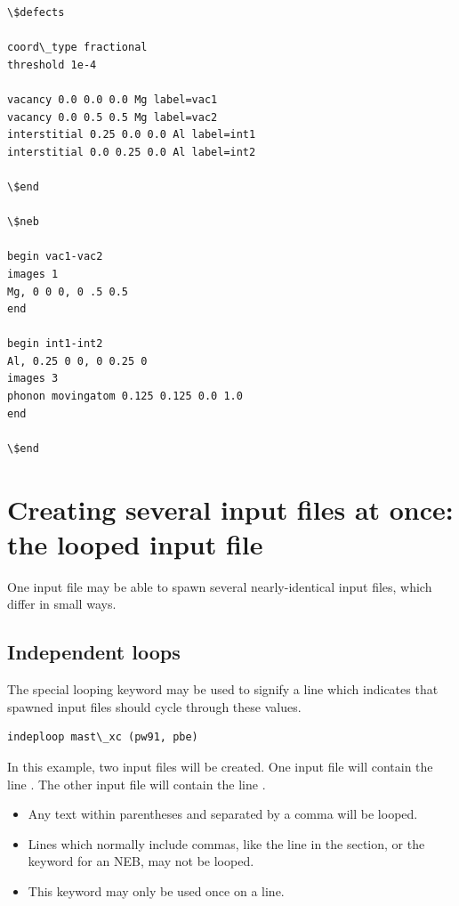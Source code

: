 \documentclass[letterpaper,10pt,english]{sphinxmanual}
\begin{document}
\begin{Verbatim}[commandchars=\\\{\}]
\$defects

coord\_type fractional
threshold 1e-4

vacancy 0.0 0.0 0.0 Mg label=vac1
vacancy 0.0 0.5 0.5 Mg label=vac2
interstitial 0.25 0.0 0.0 Al label=int1
interstitial 0.0 0.25 0.0 Al label=int2

\$end

\$neb

begin vac1-vac2
images 1
Mg, 0 0 0, 0 .5 0.5
end

begin int1-int2
Al, 0.25 0 0, 0 0.25 0
images 3
phonon movingatom 0.125 0.125 0.0 1.0
end

\$end
\end{Verbatim}


\section{Creating several input files at once: the looped input file}
\label{3_0_inputfile:creating-several-input-files-at-once-the-looped-input-file}
One input file may be able to spawn several nearly-identical input files, which differ in small ways.


\subsection{Independent loops}
\label{3_0_inputfile:independent-loops}
The special looping keyword  may be used to signify a line which indicates that spawned input files should cycle through these values.

\begin{Verbatim}[commandchars=\\\{\}]
indeploop mast\_xc (pw91, pbe)
\end{Verbatim}

In this example, two input files will be created. One input file will contain the line . The other input file will contain the line .
\begin{itemize}
\item {} 
Any text within parentheses and separated by a comma will be looped.

\item {} 
Lines which normally include commas, like the  line in the  section, or the  keyword for an NEB, may not be looped.

\item {} 
This keyword may only be used once on a line.

\end{itemize}
\end{document}
